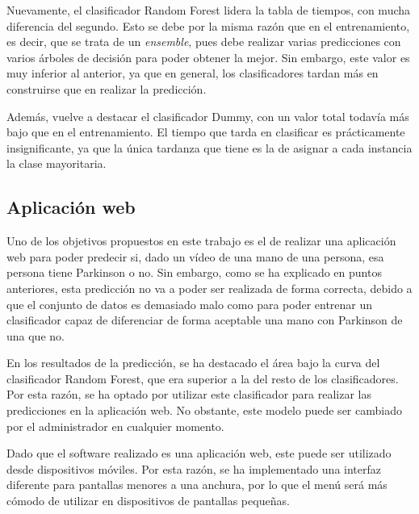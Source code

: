  Nuevamente, el clasificador Random Forest lidera la tabla de tiempos, con mucha diferencia del segundo. Esto se debe por la misma razón que en el entrenamiento, es decir, que se trata de un \textit{ensemble}, pues debe realizar varias predicciones con varios árboles de decisión para poder obtener la mejor. Sin embargo, este valor es muy inferior al anterior, ya que en general, los clasificadores tardan más en construirse que en realizar la predicción. 
 
 Además, vuelve a destacar el clasificador Dummy, con un valor total todavía más bajo que en el entrenamiento. El tiempo que tarda en clasificar es prácticamente insignificante, ya que la única tardanza que tiene es la de asignar a cada instancia la clase mayoritaria.
 
 \subsection{Aplicación web}
Uno de los objetivos propuestos en este trabajo es el de realizar una aplicación web para poder predecir si, dado un vídeo de una mano de una persona, esa persona tiene Parkinson o no. Sin embargo, como se ha explicado en puntos anteriores, esta predicción no va a poder ser realizada de forma correcta, debido a que el conjunto de datos es demasiado malo como para poder entrenar un clasificador capaz de diferenciar de forma aceptable una mano con Parkinson de una que no.

En los resultados de la predicción, se ha destacado el área bajo la curva del clasificador Random Forest, que era superior a la del resto de los clasificadores. Por esta razón, se ha optado por utilizar este clasificador para realizar las predicciones en la aplicación web. No obstante, este modelo puede ser cambiado por el administrador en cualquier momento.

Dado que el software realizado es una aplicación web, este puede ser utilizado desde dispositivos móviles. Por esta razón, se ha implementado una interfaz diferente para pantallas menores a una anchura, por lo que el menú será más cómodo de utilizar en dispositivos de pantallas pequeñas.
